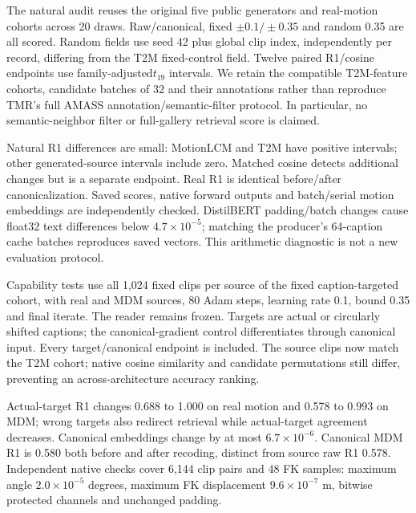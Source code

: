 \documentclass[10pt,twocolumn,letterpaper]{article}
\begin{document}
The natural audit reuses the original five public generators and real-motion cohorts across 20 draws. Raw/canonical, fixed $\pm 0.1/\pm 0.35$ and random 0.35 are all scored. Random fields use seed 42 plus global clip index, independently per record, differing from the T2M fixed-control field. Twelve paired R1/cosine endpoints use family-adjusted$t_{19}$ intervals. We retain the compatible T2M-feature cohorts, candidate batches of 32 and their annotations rather than reproduce TMR's full AMASS annotation/semantic-filter protocol. In particular, no semantic-neighbor filter or full-gallery retrieval score is claimed.

Natural R1 differences are small: MotionLCM and T2M have positive intervals; other generated-source intervals include zero. Matched cosine detects additional changes but is a separate endpoint. Real R1 is identical before/after canonicalization. Saved scores, native forward outputs and batch/serial motion embeddings are independently checked. DistilBERT padding/batch changes cause float32 text differences below $4.7\times 10^{-5}$; matching the producer's 64-caption cache batches reproduces saved vectors. This arithmetic diagnostic is not a new evaluation protocol.


Capability tests use all 1,024 fixed clips per source of the fixed caption-targeted cohort, with real and MDM sources, 80 Adam steps, learning rate 0.1, bound 0.35 and final iterate. The reader remains frozen. Targets are actual or circularly shifted captions; the canonical-gradient control differentiates through canonical input. Every target/canonical endpoint is included. The source clips now match the T2M cohort; native cosine similarity and candidate permutations still differ, preventing an across-architecture accuracy ranking.

Actual-target R1 changes 0.688 to 1.000 on real motion and 0.578 to 0.993 on MDM; wrong targets also redirect retrieval while actual-target agreement decreases. Canonical embeddings change by at most $6.7\times 10^{-6}$. Canonical MDM R1 is 0.580 both before and after recoding, distinct from source raw R1 0.578. Independent native checks cover 6,144 clip pairs and 48 FK samples: maximum angle $2.0\times 10^{-5}$ degrees, maximum FK displacement $9.6\times 10^{-7}$ m, bitwise protected channels and unchanged padding.
\end{document}
